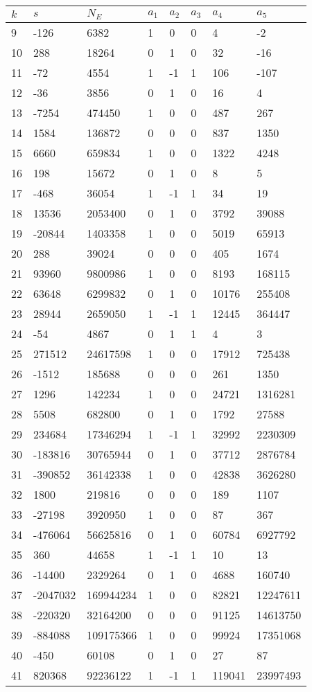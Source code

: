 \documentclass{amsart}
\begin{document}
\begin{longtable}{|l|l|l|lllll|}
\hline
$k$ & $s$ & $N_E$ & $a_1$ & $a_2$ & $a_3$ & $a_4$ & $a_5$\\
\hline
9&-126&6382&1&0&0&4&-2\\
10&288&18264&0&1&0&32&-16\\
11&-72&4554&1&-1&1&106&-107\\
12&-36&3856&0&1&0&16&4\\
13&-7254&474450&1&0&0&487&267\\
14&1584&136872&0&0&0&837&1350\\
15&6660&659834&1&0&0&1322&4248\\
16&198&15672&0&1&0&8&5\\
17&-468&36054&1&-1&1&34&19\\
18&13536&2053400&0&1&0&3792&39088\\
19&-20844&1403358&1&0&0&5019&65913\\
20&288&39024&0&0&0&405&1674\\
21&93960&9800986&1&0&0&8193&168115\\
22&63648&6299832&0&1&0&10176&255408\\
23&28944&2659050&1&-1&1&12445&364447\\
24&-54&4867&0&1&1&4&3\\
25&271512&24617598&1&0&0&17912&725438\\
26&-1512&185688&0&0&0&261&1350\\
27&1296&142234&1&0&0&24721&1316281\\
28&5508&682800&0&1&0&1792&27588\\
29&234684&17346294&1&-1&1&32992&2230309\\
30&-183816&30765944&0&1&0&37712&2876784\\
31&-390852&36142338&1&0&0&42838&3626280\\
32&1800&219816&0&0&0&189&1107\\
33&-27198&3920950&1&0&0&87&367\\
34&-476064&56625816&0&1&0&60784&6927792\\
35&360&44658&1&-1&1&10&13\\
36&-14400&2329264&0&1&0&4688&160740\\
37&-2047032&169944234&1&0&0&82821&12247611\\
38&-220320&32164200&0&0&0&91125&14613750\\
39&-884088&109175366&1&0&0&99924&17351068\\
40&-450&60108&0&1&0&27&87\\
41&820368&92236122&1&-1&1&119041&23997493\\

\end{longtable}
\end{document}
